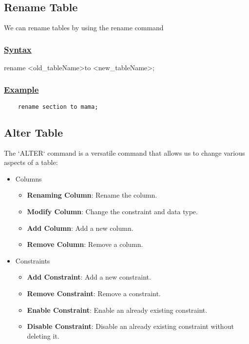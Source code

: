 \subsection{Rename Table}
\begin{tcolorbox}[title = Definition]
We can rename tables by using the rename command 
\end{tcolorbox}
\subsubsection*{\underline{Syntax}}
\begin{tcolorbox}[title = Renaming Table]
   rename \textless old\_tableName\textgreater to \textless new\_tableName\textgreater;
\end{tcolorbox}
\subsubsection*{\underline{Example}}
\begin{lstlisting}
    rename section to mama;
\end{lstlisting}

\subsection{Alter Table}
\begin{tcolorbox}[title = Definition]
The `ALTER` command is a versatile command that allows us to change various aspects of a table:
\begin{itemize}
    \item Columns
        \begin{itemize}
            \item \textbf{Renaming Column}: Rename the column.
            \item \textbf{Modify Column}: Change the constraint and data type.
            \item \textbf{Add Column}: Add a new column.
            \item \textbf{Remove Column}: Remove a column.
        \end{itemize}
    \item Constraints
        \begin{itemize}
            \item \textbf{Add Constraint}: Add a new constraint. 
            \item \textbf{Remove Constraint}: Remove a constraint.
            \item \textbf{Enable Constraint}: Enable an already existing constraint.
            \item \textbf{Disable Constraint}: Disable an already existing constraint without deleting it.
        \end{itemize}
\end{itemize}
\end{tcolorbox}

